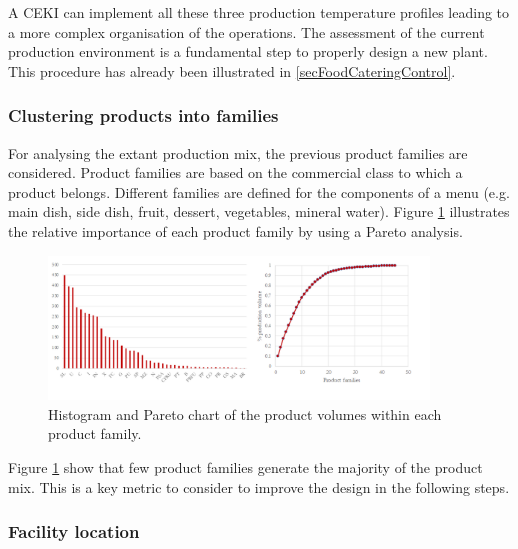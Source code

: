 A CEKI can implement all these three production temperature profiles leading to a more complex organisation of the operations. The assessment of the current production environment is a fundamental step to properly design a new plant. This procedure has already been illustrated in \ref{secFoodCateringControl}.

\subsubsection{Clustering products into families}
For analysing the extant production mix, the previous product families are considered. Product families are based on the commercial class to which a product belongs. Different families are defined for the components of a menu (e.g. main dish, side dish, fruit, dessert, vegetables, mineral water). Figure \ref{fig_prod_CAMST_productFamilies} illustrates the relative importance of each product family by using a Pareto analysis.


\begin{figure}[hbt!]
\centering
\includegraphics[width=0.9\textwidth]{sectionProduction/design_plant_figures/fig_prod_CAMST_productFamilies.png}
\captionsetup{type=figure}
\caption{Histogram and Pareto chart of the product volumes within each product family.}
\label{fig_prod_CAMST_productFamilies}
\end{figure}

Figure \ref{fig_prod_CAMST_productFamilies} show that few product families generate the majority of the product mix. This is a key metric to consider to improve the design in the following steps.

\subsubsection{Facility location}

